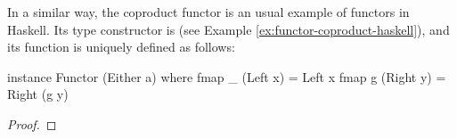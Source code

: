 \begin{example}
  \label{ex:functor-coproduct-haskell}


  In a similar way, the coproduct functor is an usual example of
  functors in Haskell. Its type constructor is 
  (see Example \ref{ex:functor-coproduct-haskell}), and its
   function is uniquely defined as follows:
  \begin{codehaskell}
instance Functor (Either a) where
  fmap _ (Left x)  = Left x
  fmap g (Right y) = Right (g y)
  \end{codehaskell}


  \begin{proof}


\end{proof}
\end{example}
